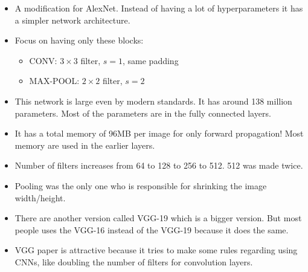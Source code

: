 \documentclass{article}
\begin{document}
\begin{itemize}
    \item A modification for AlexNet. Instead of having a lot of hyperparameters it has a simpler network architecture.
    \item Focus on having only these blocks:
    \begin{itemize}
        \item CONV: \(3 \times 3\) filter, \(s = 1\), same padding
        \item MAX-POOL: \(2 \times 2\) filter, \(s = 2\)
    \end{itemize}
    \item This network is large even by modern standards. It has around 138 million parameters. Most of the parameters are in the fully connected layers.
    \item It has a total memory of 96MB per image for only forward propagation! Most memory are used in the earlier layers.
    \item Number of filters increases from 64 to 128 to 256 to 512. 512 was made twice.
    \item Pooling was the only one who is responsible for shrinking the image width/height.
    \item There are another version called VGG-19 which is a bigger version. But most people uses the VGG-16 instead of the VGG-19 because it does the same.
    \item VGG paper is attractive because it tries to make some rules regarding using CNNs, like doubling the number of filters for convolution layers.
\end{itemize}

\printindex
\end{document}
